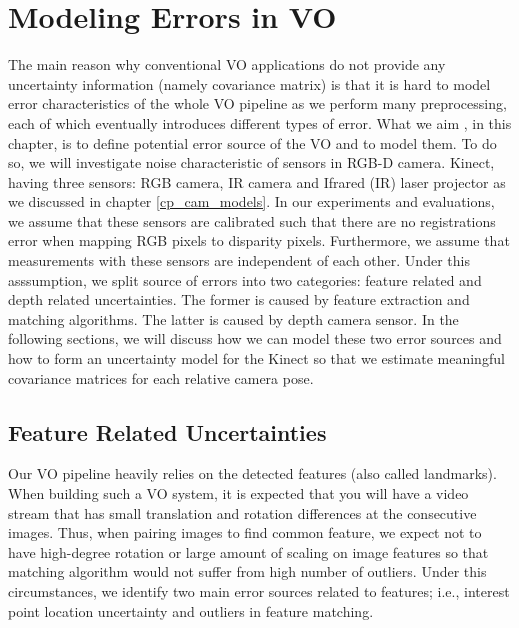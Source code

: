 \documentclass[a4paper]{report}
\numberwithin{figure}{section}
\begin{document}
\section{Modeling Errors in VO} \label{sc_spatial_uncertainty}

The main reason why conventional VO applications do not provide any uncertainty 
information (namely covariance matrix) is that it is hard to model 
error characteristics of the whole VO pipeline as we perform many preprocessing, 
each of which eventually introduces different types of error. What we aim 
, in this chapter, is to define potential error source of the VO and 
to model them. To do so, we will investigate noise characteristic of 
sensors in RGB-D camera. 
Kinect, having three sensors: RGB camera, IR camera
and Ifrared (IR) laser projector as we discussed in chapter \ref{cp_cam_models}. 
In our experiments and evaluations,
we assume that these sensors are calibrated such that 
there are no registrations error when mapping RGB pixels to disparity pixels. 
Furthermore, 
we assume that measurements with these sensors are independent of each other. 
Under this asssumption, 
we split source of errors into two categories: feature related 
and depth related uncertainties.
The former is caused by feature extraction and matching algorithms. 
The latter is caused by depth camera sensor. 
In the following sections, we will discuss how we can model these 
two error sources and how to form an uncertainty model 
for the Kinect so that we estimate meaningful covariance matrices for each 
relative camera pose.

\subsection{Feature Related Uncertainties} \label{sb_sc_pixel_uncertainty}

Our VO pipeline heavily relies on the detected features 
(also called landmarks). When building such a VO system, 
it is expected that you will have a video stream that has small translation 
and rotation differences at the consecutive images. Thus, when pairing images 
to find common feature, we expect not to have high-degree rotation or large 
amount of scaling on image features so that matching algorithm would not suffer 
from high number of outliers. Under this circumstances, we identify two 
main error sources related to features; i.e., interest point location uncertainty 
and outliers in feature matching.
\end{document}
